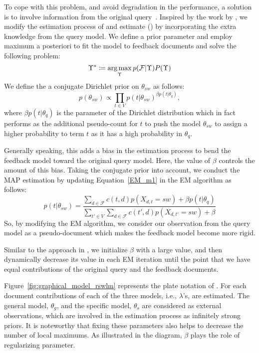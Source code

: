 To cope with this problem, and avoid degradation in the performance, a solution is to involve information from the original query~\citep{Harman:1992}. Inspired by the work by \citet{Tao:2006}, we modify the estimation process of \acswlm and estimate \RSWLMs (\acrswlm) by incorporating the extra knowledge from the query model. We define a prior parameter and employ maximum a posteriori to fit the model to feedback documents and solve the following problem:
\begin{equation}
\Upsilon^* \coloneqq \operatorname*{arg\,max}_\Upsilon p(\mathcal{F}|\Upsilon)P(\Upsilon)
\end{equation}
We define the a conjugate Dirichlet prior on $\theta_{sw}$ as follows:
\begin{equation}
p(\theta_{sw}) \varpropto \prod_{t \in V} p(t|\theta_{sw})^{\beta p(t|\theta_q)},
\end{equation}
where $\beta p(t|\theta_q)$ is the parameter of the Dirichlet distribution which in fact performs as the additional pseudo-count for  $t$ to push the model $\theta_{sw}$ to assign a higher probability to term $t$ as it has a high probability in $\theta_q$. 

Generally speaking, this adds a bias in the estimation process to bend the feedback model toward the original query model. 
Here, the value of $\beta$ controls the amount of this bias. 
Taking the conjugate prior into account, we conduct the MAP estimation by updating Equation~\ref{EM_m1} in the EM algorithm as follows:
\begin{equation}
p(t|\theta_{sw}) = 
\frac{\sum_{d \in \mathcal{F}}c(t,d) p(X_{d,t} = sw) + \beta p(t|\theta_q) }{\sum_{t' \in V}\sum_{d \in \mathcal{F}}c(t',d) p(X_{d,t'} = sw) + \beta}
\label{EM_m1_new}
\end{equation}
So, by modifying the EM algorithm, we consider our observation from the query model as a pseudo-document which makes the feedback model become more rigid. 

Similar to the approach in \citep{Tao:2006}, we initialize $\beta$ with a large value, and then dynamically decrease its value in each EM iteration until the point that we have equal contributions of the original query and the feedback documents. 

Figure~\ref{fig:graphical_model_rswlm} represents the plate notation of \rswlms. 
For each document contributions of each of the three models, i.e., $\lambda$'s, are estimated. The general model, $\theta_g$, and  the specific model, $\theta_s$ are considered as external observations, which are involved in the estimation process as infinitely strong priors. It is noteworthy that fixing these parameters also helps to decrease the number of local maximums. As illustrated in the diagram, $\beta$ plays the role of regularizing parameter. 

